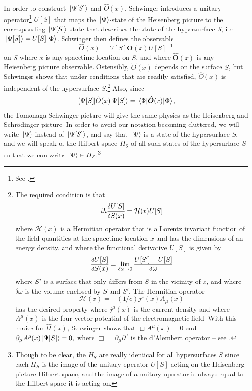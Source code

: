 In order to construct $\ket*{\Psi[S]}$ and $\hat{O}(x)$, Schwinger introduces a unitary operator\footnote{See \cite[p. 1448]{SchwingerJulianI}.} $U[S]$ that maps the $\ket*{\Phi}$-state of the Heisenberg picture to the corresponding $\ket*{\Psi[S]}$-state that describes the state of the hypersurface $S$, i.e. $\ket*{\Psi[S]}=U[S]\ket*{\Phi}$. Schwinger then defines the observable  
\begin{equation}\label{tsobservable}
  \hat{O}(x)=U[S]\hat{\bm{O}}(x)U[S]^{-1}
\end{equation}
on $S$ where $x$ is any spacetime location on $S$, and where $\hat{\bm{O}}(x)$ is any Heisenberg picture observable. Ostensibly, $\hat{O}(x)$ depends on the surface $S$,  but Schwinger shows that under conditions that are readily satisfied, $\hat{O}(x)$ is independent of the hypersurface $S$.\footnote{
  The required condition is that 
  $$i\hbar\fdv{U[S]}{S(x)}=\mathcal{H}(x)U[S] $$
  where $\mathcal{H}(x)$ is a Hermitian operator that is a Lorentz invariant function of the field quantities at the spacetime location $x$ and has the dimensions of an energy density, and where the functional derivative $U[S]$ is given by
  $$\fdv{U[S]}{S(x)}=\lim_{\delta \omega\rightarrow 0}\frac{U[S']-U[S]}{\delta\omega} $$
  where $S'$ is a surface that only differs from $S$ in the vicinity of $x$, and where $\delta\omega$ is the volume enclosed by $S$ and $S'$. The Hermitian operator $$\mathcal{H}(x)=-(1/c)j^\mu(x)A_\mu(x)$$
  has the desired property where $j^\mu(x)$ is the current density and where $A^\mu(x)$ is the four-vector potential of the electromagnetic field. With this choice for $\hat{H}(x)$, Schwinger shows that $\Box A^\mu(x)=0$ and $\partial_\mu A^\mu(x)\ket*{\Psi[S]}=0,$ where $\Box=\partial_\mu\partial^\mu$ is the d'Alembert operator -- see \cite[p. 1449-1450]{SchwingerJulianI}.\label{Sindepedence}  }
  Also, since 
\begin{equation}\label{schwingerformula}
\ev*{\hat{O}(x)}{\Psi[S]}=\ev*{\hat{\bm{O}}(x)}{\Phi},
\end{equation}
the Tomonaga-Schwinger picture will give the same physics as the Heisenberg and Schr\"{o}dinger picture. In order to avoid our notation becoming cluttered, we will write $\ket*{\Psi}$ instead of $\ket*{\Psi[S]}$, and say that $\ket*{\Psi}$ is a state of the hypersurface $S$, and we will speak of the Hilbert space $H_S$\label{HSdef} of all such states of the hypersurface $S$ so that we can write $\ket*{\Psi}\in H_S$.\footnote{Though to be clear,\label{HSclarification} the $H_S$ are really identical for all hypersurfaces $S$ since each $H_S$ is the image of the unitary operator $U[S]$ acting on the Heisenberg-picture Hilbert space, and the image of a unitary operator is always equal to the Hilbert space it is acting on.}

